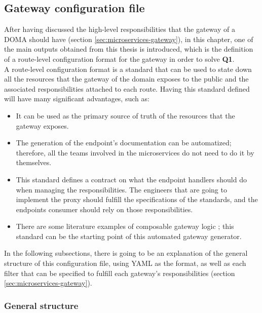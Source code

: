 \documentclass[english, 12pt, a4paper, sci, utf8, a-1b, online]{aaltothesis}
\begin{document}
\subsection{Gateway configuration file}
\label{sec:gateway-configuration-file}

After having discussed the high-level responsibilities that the gateway of a DOMA should have (section \ref{sec:microservices-gateway}), in this chapter, one of the main outputs obtained from this thesis is introduced, which is the definition of a route-level configuration format for the gateway in order to solve \textbf{Q1}.\\

A route-level configuration format is a standard that can be used to state down all the resources that the gateway of the domain exposes to the public and the associated responsibilities attached to each route. Having this standard defined will have many significant advantages, such as:

\begin{itemize}
    \item It can be used as the primary source of truth of the resources that the gateway exposes.
    \item The generation of the endpoint's documentation can be automatized; therefore, all the teams involved in the microservices do not need to do it by themselves.
    \item This standard defines a contract on what the endpoint handlers should do when managing the responsibilities. The engineers that are going to implement the proxy should fulfill the specifications of the standards, and the endpoints consumer should rely on those responsibilities.
    \item There are some literature examples of composable gateway logic \cite{UberGateway}; this standard can be the starting point of this automated gateway generator. 
\end{itemize}

In the following subsections, there is going to be an explanation of the general structure of this configuration file, using YAML as the format, as well as each filter that can be specified to fulfill each gateway's responsibilities (section \ref{sec:microservices-gateway}).

\subsubsection*{General structure}
\end{document}
